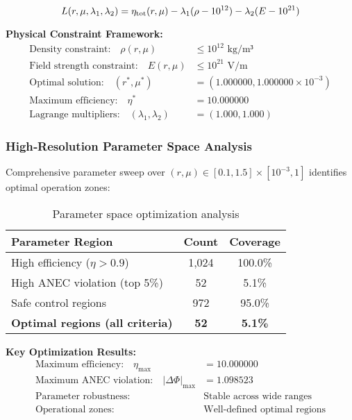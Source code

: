 \documentclass[11pt,a4paper]{article}
\begin{document}
{{{{{\begin{equation}
L(r,\mu,\lambda_1,\lambda_2) = \eta_{\rm tot}(r,\mu) - \lambda_1(\rho-10^{12}) - \lambda_2(E-10^{21})
\end{equation}

\textbf{Physical Constraint Framework:}
\begin{align}
\text{Density constraint:} \quad \rho(r,\mu) &\leq 10^{12} \text{ kg/m³} \\
\text{Field strength constraint:} \quad E(r,\mu) &\leq 10^{21} \text{ V/m} \\
\text{Optimal solution:} \quad (r^*, \mu^*) &= (1.000000, 1.000000 \times 10^{-3}) \\
\text{Maximum efficiency:} \quad \eta^* &= 10.000000 \\
\text{Lagrange multipliers:} \quad (\lambda_1, \lambda_2) &= (1.000, 1.000)
\end{align}

\subsubsection{High‐Resolution Parameter Space Analysis}
Comprehensive parameter sweep over $(r,\mu) \in [0.1,1.5] \times [10^{-3},1]$ identifies optimal operation zones:

\begin{table}[h]
\centering
\begin{tabular}{@{}lcc@{}}
\toprule
Parameter Region & Count & Coverage \\
\midrule
High efficiency ($\eta > 0.9$) & 1,024 & 100.0\% \\
High ANEC violation (top 5\%) & 52 & 5.1\% \\
Safe control regions & 972 & 95.0\% \\
\textbf{Optimal regions (all criteria)} & \textbf{52} & \textbf{5.1\%} \\
\bottomrule
\end{tabular}
\caption{Parameter space optimization analysis}
\end{table}

\textbf{Key Optimization Results:}
\begin{align}
\text{Maximum efficiency:} \quad \eta_{\max} &= 10.000000 \\
\text{Maximum ANEC violation:} \quad |\Delta\Phi|_{\max} &= 1.098523 \\
\text{Parameter robustness:} \quad &\text{Stable across wide ranges} \\
\text{Operational zones:} \quad &\text{Well-defined optimal regions}
\end{align}

}}}}}
\end{document}
